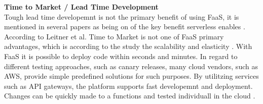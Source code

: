 \documentclass[a4paper,twoside,11pt, pagesize]{scrartcl}
\begin{document}
\begin{spacing}{1.2}
\textbf{Time to Market / Lead Time Development}\\ Tough lead time developemnt is not the primary benefit of using FaaS, it is mentioned in several papers as being on of the key benefit serverless enables \cite{adzic2017serverless} \cite{ast2017self}. According to Leitner et al. Time to Market is not one of FaaS primary advantages, which is according to the study the scalability and elasticity \cite{leitner2019mixed}. With FaaS it is possible to deploy code within seconds and minutes. In regard to different testing approaches, such as canary releases, many cloud vendors, such as AWS, provide simple predefined solutions for such purposes. By utilitzing services such as API gateways, the platform supports fast developemnt and deployment. Changes can be quickly made to a functions and tested individuall in the cloud \cite{sewak2018winning}.\\\\

\end{spacing}
\end{document}
